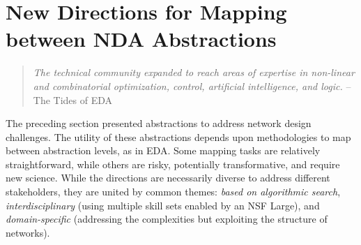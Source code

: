 \section{New Directions for Mapping between NDA Abstractions}
\label{sec:approaches}

\begin{quote}
{\em The technical community expanded to reach areas of expertise in non-linear and combinatorial optimization, control, artificial intelligence, and logic.} -- The Tides of EDA~\cite{alberto}
\vspace{-2mm}
\end{quote}

The preceding section presented abstractions to address network design challenges. The utility of these abstractions depends upon methodologies to map between abstraction levels, as in EDA. Some mapping tasks are relatively straightforward, while others are risky, potentially transformative, and require new science. While the directions are necessarily diverse to address different stakeholders, they are united by common themes: {\em based on algorithmic search}, {\em interdisciplinary} (using multiple skill sets enabled by an NSF Large), and {\em domain-specific} (addressing the complexities but exploiting the structure of networks).






%






